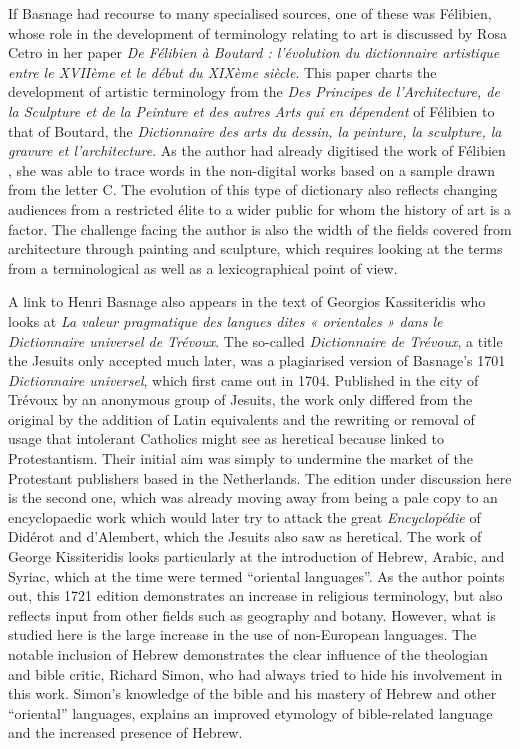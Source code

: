 \documentclass[output=paper]{langscibook}
\begin{document}
If Basnage had recourse to many specialised sources, one of these was Félibien, whose role in the development of terminology relating to art is discussed by Rosa Cetro in her paper \textit{De Félibien à Boutard : l’évolution du dictionnaire artistique entre le XVIIème et le début du XIXème siècle}. This paper charts the development of artistic terminology from the \textit{Des Principes de l’Architecture, de la Sculpture et de la Peinture et des autres Arts qui en dépendent } of Félibien to that of Boutard, the \textit{Dictionnaire des arts du dessin, la peinture, la sculpture, la gravure et l’architecture}. As the author had already digitised the work of Félibien \citep{Cetro2022}, she was able to trace words in the non-digital works based on a sample drawn from the letter C. The evolution of this type of dictionary also reflects changing audiences from a restricted élite to a wider public for whom the history of art is a factor. The challenge facing the author is also the width of the fields covered from architecture through painting and sculpture, which requires looking at the terms from a terminological as well as a lexicographical point of view.

A link to Henri Basnage also appears in the text of Georgios Kassiteridis who looks at \textit{La valeur pragmatique des langues dites « orientales » dans le Dictionnaire universel de Trévoux}. The so-called \textit{Dictionnaire de Trévoux}, a title the Jesuits only accepted much later, was a plagiarised version of Basnage's 1701 \textit{Dictionnaire universel}, which first came out in 1704. Published in the city of Trévoux by an anonymous group of Jesuits, the work only differed from the original by the addition of Latin equivalents and the rewriting or removal of usage that intolerant Catholics might see as heretical because linked to Protestantism. Their initial aim was simply to undermine the market of the Protestant publishers based in the Netherlands. The edition under discussion here is the second one, which was already moving away from being a pale copy to an encyclopaedic work which would later try to attack the great \textit{Encyclopédie} of Didérot and d'Alembert, which the Jesuits also saw as heretical. The work of George Kissiteridis looks particularly at the introduction of Hebrew, Arabic, and Syriac, which at the time were termed “oriental languages”. As the author points out, this 1721 edition demonstrates an increase in religious terminology, but also reflects input from other fields such as geography and botany. However, what is studied here is the large increase in the use of non-European languages. The notable inclusion of Hebrew demonstrates the clear influence of the theologian and bible critic, Richard Simon, who had always tried to hide his involvement in this work. Simon's knowledge of the bible and his mastery of Hebrew and other “oriental” languages, explains an improved etymology of bible-related language and the increased presence of Hebrew.
\end{document}
